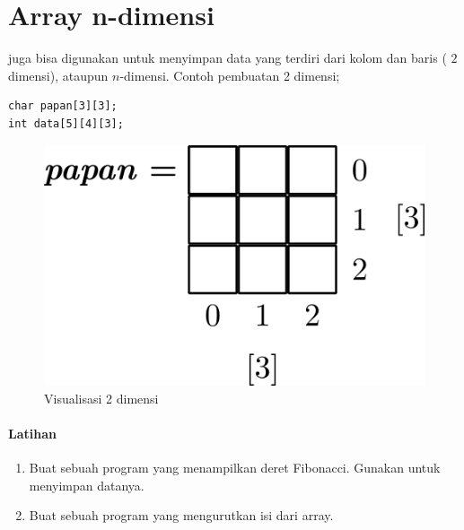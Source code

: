 \documentclass[../main.tex]{subfiles}
\begin{document}

\section{Array n-dimensi}
 juga bisa digunakan untuk menyimpan data yang terdiri dari kolom dan
baris ( \(2\) dimensi), ataupun \(n\)-dimensi. Contoh pembuatan
 2 dimensi;

\begin{verbatim}
char papan[3][3];
int data[5][4][3];
\end{verbatim}

\begin{figure}[h]
\centering
\includegraphics[scale=0.5]{img/array_2_vis}
\caption{Visualisasi  2 dimensi}
\label{arr:2vis}
\end{figure}

\paragraph{Latihan}
\begin{enumerate}
	\item Buat sebuah program yang menampilkan deret Fibonacci. Gunakan  untuk menyimpan datanya.
	\item Buat sebuah program yang mengurutkan isi dari array.
\end{enumerate}
\end{document}
